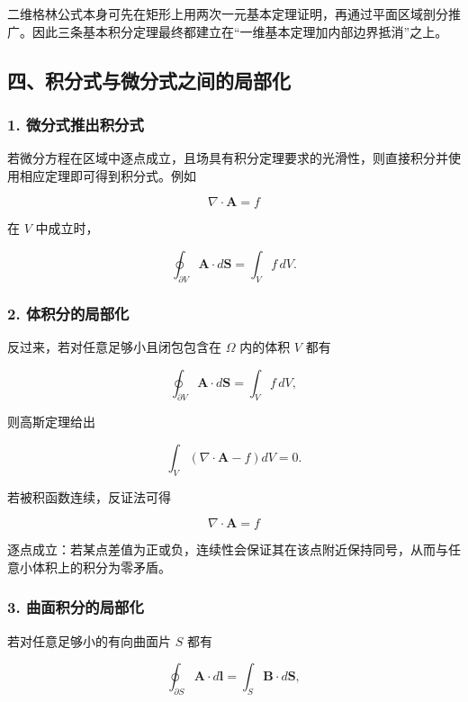 二维格林公式本身可先在矩形上用两次一元基本定理证明，再通过平面区域剖分推广。因此三条基本积分定理最终都建立在``一维基本定理加内部边界抵消''之上。

\subsection{四、积分式与微分式之间的局部化}\label{m1:ux56dbux79efux5206ux5f0fux4e0eux5faeux5206ux5f0fux4e4bux95f4ux7684ux5c40ux90e8ux5316}

\subsubsection{1.
微分式推出积分式}\label{m1:ux5faeux5206ux5f0fux63a8ux51faux79efux5206ux5f0f}

若微分方程在区域中逐点成立，且场具有积分定理要求的光滑性，则直接积分并使用相应定理即可得到积分式。例如

\[
\nabla\cdot\mathbf A=f
\]

在 \(V\) 中成立时，

\[
\oint_{\partial V}\mathbf A\cdot d\mathbf S
=
\int_Vf\,dV.
\]

\subsubsection{2.
体积分的局部化}\label{m1:ux4f53ux79efux5206ux7684ux5c40ux90e8ux5316}

反过来，若对任意足够小且闭包包含在 \(\Omega\) 内的体积 \(V\) 都有

\[
\oint_{\partial V}\mathbf A\cdot d\mathbf S
=
\int_Vf\,dV,
\]

则高斯定理给出

\[
\int_V
\left(
\nabla\cdot\mathbf A-f
\right)dV=0.
\]

若被积函数连续，反证法可得

\[
\boxed{
\nabla\cdot\mathbf A=f
}
\]

逐点成立：若某点差值为正或负，连续性会保证其在该点附近保持同号，从而与任意小体积上的积分为零矛盾。

\subsubsection{3.
曲面积分的局部化}\label{m1:ux66f2ux9762ux79efux5206ux7684ux5c40ux90e8ux5316}

若对任意足够小的有向曲面片 \(S\) 都有

\[
\oint_{\partial S}\mathbf A\cdot d\mathbf l
=
\int_S\mathbf B\cdot d\mathbf S,
\]

